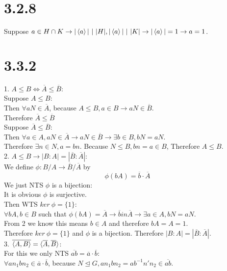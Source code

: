 \documentclass{article}
\begin{document}
\section{3.2.8}
Suppose $a \in H \cap K \rightarrow |\braket{a}|\ |\ |H|, |\braket{a}|\ |\ |K| \rightarrow |\braket{a}| = 1 \rightarrow a = 1$.
\section{3.3.2}
1. $A \leq B \iff \overline{A} \leq \overline{B}$:\\
Suppose $A \leq B$:\\
Then $\forall aN \in \overline{A}$, because $A \leq B, a \in B \rightarrow aN \in \overline{B}$.\\
Therefore $\overline{A} \leq \overline{B}$\\
Suppose $\overline{A} \leq \overline{B}$:\\
Then $\forall a \in A, aN \in \overline{A} \rightarrow aN \in \overline{B} \rightarrow \exists b \in B, bN = aN$.\\
Therefore $\exists n \in N, a = bn$. Because $N \leq B, bn = a \in B$, Therefore $A \leq B$.\\
2. $A \leq B \rightarrow |B:A| = |\overline{B}:\overline{A}|$:\\
We define $\phi: B/A \rightarrow \overline{B}/\overline{A}$ by
\begin{equation*}
    \phi(bA) = \overline{b}\cdot \overline{A}
\end{equation*}
We just NTS $\phi$ is a bijection:\\
It is obvious $\phi$ is surjective.\\
Then WTS $ker\ \phi = \{1\}$:\\
$\forall bA, b \in B$ such that $\phi(bA) = \overline{A} \rightarrow \overline{b} in \overline{A} \rightarrow \exists a \in A, bN = aN$.\\
From 2 we know this means $b \in A$ and therefore $bA = A = 1$.\\
Therefore $ker\ \phi = \{1\}$ and $\phi$ is a bijection. Therefore $|B:A| = |\overline{B}:\overline{A}|$.\\
3. $\overline{\braket{A, B}} = \braket{\overline{A}, \overline{B}}$:\\
For this we only NTS $\overline{ab} = \overline{a}\cdot \overline{b}$:\\
$\forall an_1bn_2 \in \overline{a}\cdot\overline{b}$, because $N \trianglelefteq G, an_1bn_2 = ab^{-1}n'n_2 \in \overline{ab}$.\\
\end{document}
